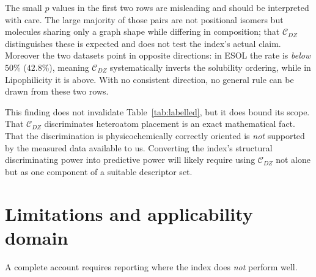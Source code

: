 \documentclass[11pt,a4paper]{article}
\theoremstyle{plain}
\theoremstyle{definition}
\theoremstyle{remark}
\newcommand{\CDZ}{\mathcal{C}_{DZ}}
\begin{document}
The small $p$ values in the first two rows are misleading and should be
interpreted with care. The large majority of those pairs are not positional
isomers but molecules sharing only a graph shape while differing in composition;
that $\CDZ$ distinguishes these is expected and does not test the index's actual
claim. Moreover the two datasets point in opposite directions: in ESOL the rate
is \emph{below} $50\%$ ($42.8\%$), meaning $\CDZ$ systematically inverts the
solubility ordering, while in Lipophilicity it is above. With no consistent
direction, no general rule can be drawn from these two rows.

This finding does not invalidate Table~\ref{tab:labelled}, but it does bound its
scope. That $\CDZ$ discriminates heteroatom placement is an exact mathematical
fact. That the discrimination is physicochemically correctly oriented is
\emph{not} supported by the measured data available to us. Converting the
index's structural discriminating power into predictive power will likely require
using $\CDZ$ not alone but as one component of a suitable descriptor set.

\section{Limitations and applicability domain}
\label{sec:limits}

A complete account requires reporting where the index does \emph{not} perform
well.
\end{document}
